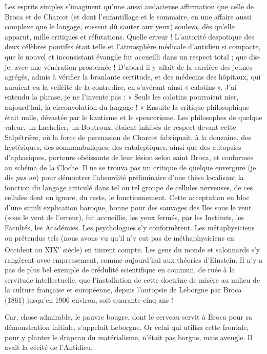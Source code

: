 \documentclass[french,twoside]{book} %
\begin{document}
Les esprits simples s’imaginent qu’une aussi audacieuse affirmation que celle de Broca et de Charcot (et dont l’enfantillage et le sommaire, en une affaire aussi complexe que le langage, eussent dû sauter aux yeux) souleva, dès qu’elle apparut, mille critiques et réfutations. Quelle erreur ! L’autorité despotique des deux célèbres pontifes était telle et l’atmosphère médicale d’antidieu si compacte, que le nouvel et inconsistant évangile fut accueilli dans un respect total ; que dis-je, avec une vénération prosternée ! D’abord il y allait de la carrière des jeunes agrégés, admis à vérifier la branlante certitude, et des médecins des hôpitaux, qui auraient eu la velléité de la contredire, en s’avérant ainsi « calotins ». J’ai entendu la phrase, je ne l’invente pas : « Seuls les calotins pourraient nier, aujourd’hui, la circonvolution du langage ! » Ensuite la critique philosophique était nulle, dévastée par le kantisme et le spencerisme. Les philosophes de quelque valeur, un Lachelier, un Boutroux, étaient inhibés de respect devant cette Salpétrière, où la force de persuasion de Charcot fabriquait, à la douzaine, des hystériques, des somnambuliques, des cataleptiques, ainsi que des autopsies d’aphasiques, porteurs obéissants de leur lésion selon saint Broca, et conformes au schéma de la Cloche. Il ne se trouva pas un critique de quelque envergure (je dis {\itshape pas un}) pour démontrer l’absurdité préliminaire d’une thèse localisant la fonction du langage articulé dans tel ou tel groupe de cellules nerveuses, de ces cellules dont on ignore, du reste, le fonctionnement. Cette acceptation en bloc d’une simili explication baroque, bonne pour des sauvages des Iles sous le vent (sous le vent de l’erreur), fut accueillie, les yeux fermés, par les Instituts, les Facultés, les Académies. Les psychologues s’y conformèrent. Les métaphysiciens ou prétendus tels (nous avons vu qu’il n’y eut pas de méthaphysiciens en Occident au XIX\textsuperscript{e} siècle) en tinrent compte. Les gens du monde et salonnards s’y rangèrent avec empressement, comme aujourd’hui aux théories d’Einstein. Il n’y a pas de plus bel exemple de crédulité scientifique en commun, de ruée à la servitude intellectuelle, que l’installation de cette doctrine de misère au milieu de la culture française et européenne, depuis l’autopsie de Leborgne par Broca (1861) jusqu’en 1906 environ, soit quarante-cinq ans !\par
Car, chose admirable, le pauvre bougre, dont le cerveau servit à Broca pour sa démonstration initiale, s’appelait Leborgne. Or celui qui utilisa cette frontale, pour y planter le drapeau du matérialisme, n’était pas borgne, mais aveugle. Il avait la cécité de l’Antidieu.\par
\end{document}
